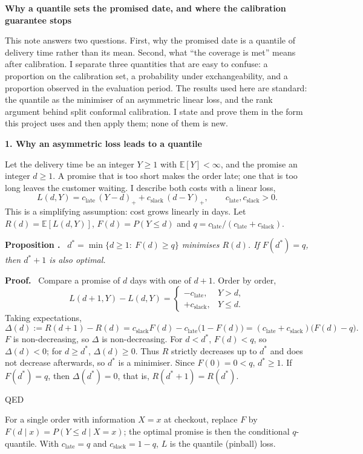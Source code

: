 \documentclass[11pt]{article}
\newcommand{\cl}{c_{\text{late}}}
\newcommand{\cs}{c_{\text{slack}}}
\newcommand{\1}{\mathbf 1}
\newcounter{prop}
\newenvironment{prop}{\refstepcounter{prop}\par\medskip\noindent\textbf{Proposition \theprop.}\ \itshape}{\par\medskip}
\newenvironment{pf}{\par\noindent\textbf{Proof.}\ }{\par\noindent\hfill QED\par\medskip}
\begin{document}
{\Large\textbf{Why a quantile sets the promised date, and where the calibration guarantee stops}}

\medskip
This note answers two questions. First, why the promised date is a quantile of delivery time rather than its mean. Second, what ``the coverage is met'' means after calibration. I separate three quantities that are easy to confuse: a proportion on the calibration set, a probability under exchangeability, and a proportion observed in the evaluation period. The results used here are standard: the quantile as the minimiser of an asymmetric linear loss, and the rank argument behind split conformal calibration. I state and prove them in the form this project uses and then apply them; none of them is new.

\bigskip
\textbf{1. Why an asymmetric loss leads to a quantile}

Let the delivery time be an integer \(Y\ge1\) with \(\mathbb E[Y]<\infty\), and the promise an integer \(d\ge1\). A promise that is too short makes the order late; one that is too long leaves the customer waiting. I describe both costs with a linear loss,
\[
L(d,Y)=\cl\,(Y-d)_+ +\cs\,(d-Y)_+,\qquad \cl,\cs>0 .
\]
This is a simplifying assumption: cost grows linearly in days. Let \(R(d)=\mathbb E[L(d,Y)]\), \(F(d)=P(Y\le d)\) and \(q=\cl/(\cl+\cs)\).

\begin{prop}
\(d^\ast=\min\{d\ge1:\ F(d)\ge q\}\) minimises \(R(d)\). If \(F(d^\ast)=q\), then \(d^\ast+1\) is also optimal.
\end{prop}

\begin{pf}
Compare a promise of \(d\) days with one of \(d+1\). Order by order,
\[
L(d+1,Y)-L(d,Y)=
\begin{cases}
-\cl, & Y>d,\\
+\cs, & Y\le d .
\end{cases}
\]
Taking expectations,
\[
\Delta(d):=R(d+1)-R(d)=\cs F(d)-\cl\bigl(1-F(d)\bigr)=(\cl+\cs)\bigl(F(d)-q\bigr).
\]
\(F\) is non-decreasing, so \(\Delta\) is non-decreasing. For \(d<d^\ast\), \(F(d)<q\), so \(\Delta(d)<0\); for \(d\ge d^\ast\), \(\Delta(d)\ge0\). Thus \(R\) strictly decreases up to \(d^\ast\) and does not decrease afterwards, so \(d^\ast\) is a minimiser. Since \(F(0)=0<q\), \(d^\ast\ge1\). If \(F(d^\ast)=q\), then \(\Delta(d^\ast)=0\), that is, \(R(d^\ast+1)=R(d^\ast)\).
\end{pf}

For a single order with information \(X=x\) at checkout, replace \(F\) by \(F(d\mid x)=P(Y\le d\mid X=x)\); the optimal promise is then the conditional \(q\)-quantile. With \(\cl=q\) and \(\cs=1-q\), \(L\) is the quantile (pinball) loss.
\end{document}
